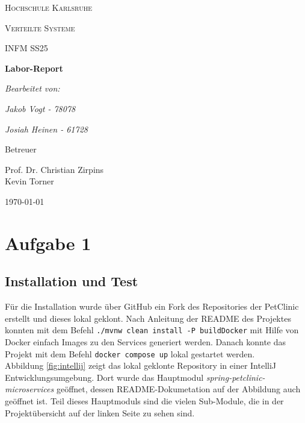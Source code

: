 \documentclass[12pt,a4paper]{article}
\begin{document}
\begin{titlepage}
	\centering
	{\scshape\LARGE Hochschule Karlsruhe \par}
	\vspace{1cm}
	{\scshape\Large Verteilte Systeme\par}
	{\scshape\small INFM SS25\par}
	\vspace{1.5cm}
	{\huge\bfseries Labor-Report\par}
	\vspace{2cm}
	{\Large\itshape Bearbeitet von:\par}
	{\Large\itshape Jakob Vogt - 78078\par}
	{\Large\itshape Josiah Heinen - 61728\par}
	\vfill
	Betreuer\par
	Prof. Dr. Christian Zirpins \\
	Kevin Torner

	\vfill

	{\large \today\par}
\end{titlepage}

\tableofcontents
\newpage

\section{Aufgabe 1}

\subsection{Installation und Test}

Für die Installation wurde über GitHub ein Fork des Repositories der PetClinic \cite{petclinic} erstellt und dieses lokal geklont. Nach Anleitung der README des Projektes konnten mit dem Befehl \lstinline|./mvnw clean install -P buildDocker| mit Hilfe von Docker einfach Images zu den Services generiert werden. Danach konnte das Projekt mit dem Befehl \lstinline|docker compose up| lokal gestartet werden. \\

Abbildung \ref{fig:intellij} zeigt das lokal geklonte Repository in einer IntelliJ Entwicklungsumgebung. Dort wurde das Hauptmodul \textit{spring-petclinic-microservices} geöffnet, dessen README-Dokumetation auf der Abbildung auch geöffnet ist. Teil dieses Hauptmoduls sind die vielen Sub-Module, die in der Projektübersicht auf der linken Seite zu sehen sind.
\end{document}
